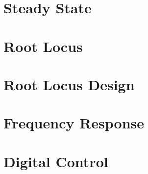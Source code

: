 \documentclass[11pt]{article}
\begin{document}

    \section{Steady State}


    \section{Root Locus}


    \section{Root Locus Design}


    \section{Frequency Response}


    \section{Digital Control}


    
\end{document}

